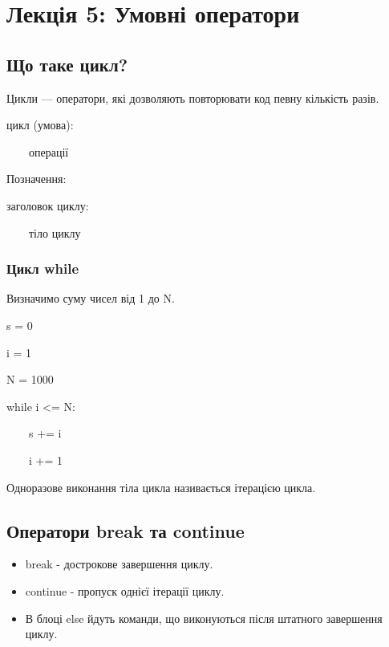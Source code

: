 \section{Лекція 5: Умовні оператори}
 
 \subsection{Що таке цикл?} 
\begin{frame}
Цикли — оператори, які дозволяють повторювати код певну кількість разів.

\huge{цикл (умова):

~~~~операції
}

\normalsize Позначення:

\large{заголовок циклу:

~~~~тіло циклу
}


\end{frame}

\begin{frame}
\frametitle{Цикл while}
Визначимо суму чисел від 1 до N.

s = 0

i = 1 

N = 1000

while i <= N:

~~~~s += i

~~~~i += 1

Одноразове виконання тіла цикла називається ітерацією цикла.

\end{frame}

 \subsection{Оператори break та continue} 
\begin{frame}
\begin{itemize}
  \item break - дострокове завершення циклу.
  \item continue - пропуск однієї ітерації циклу.
  \item В блоці else йдуть команди, що виконуються після штатного завершення циклу.
\end{itemize}
\end{frame}
